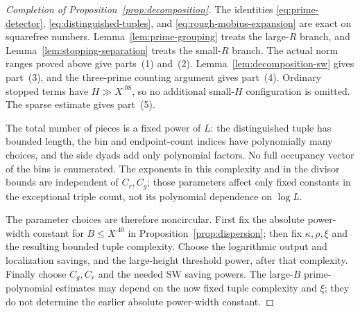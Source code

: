 \begin{proof}[Completion of Proposition~\ref{prop:decomposition}]
The identities \eqref{eq:prime-detector},
\eqref{eq:distinguished-tuples}, and \eqref{eq:rough-mobius-expansion}
are exact on squarefree numbers.  Lemma~\ref{lem:prime-grouping}
treats the large-$R$ branch, and Lemma~\ref{lem:stopping-separation}
treats the small-$R$ branch.  The actual norm ranges proved above
give parts~(1) and~(2).  Lemma~\ref{lem:decomposition-sw} gives
part~(3), and the three-prime counting argument gives part~(4).
Ordinary stopped terms have $H\gg X^{.08}$, so no additional
small-$H$ configuration is omitted.  The sparse estimate gives
part~(5).

The total number of pieces is a fixed power of $L$: the distinguished
tuple has bounded length, the bin and endpoint-count indices have
polynomially many choices, and the side dyads add only polynomial
factors.  No full occupancy vector of the bins is enumerated.
The exponents in this complexity and in the divisor bounds are
independent of $C_r,C_g$; those parameters affect only fixed constants
in the exceptional triple count, not its polynomial dependence on
$\log L$.

The parameter choices are therefore noncircular.  First fix the
absolute power-width constant for $B\le X^{.40}$ in
Proposition~\ref{prop:dispersion}; then fix $\kappa,\rho,\xi$ and
the resulting bounded tuple complexity.  Choose the logarithmic
output and localization savings, and the large-height threshold
power, after that complexity.  Finally choose $C_g,C_r$ and the
needed SW saving powers.  The large-$B$ prime-polynomial estimates
may depend on the now fixed tuple complexity and $\xi$; they do not
determine the earlier absolute power-width constant.
\end{proof}
